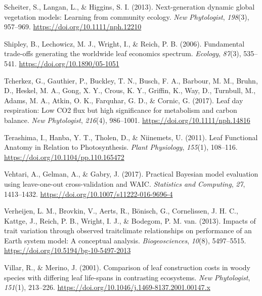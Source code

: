 \documentclass[
  12pt,
  a4paper,
,tablecaptionabove
]{scrartcl}
\newlength{\cslhangindent}
\newenvironment{CSLReferences}[2] %
 {%
  \setlength{\parindent}{0pt}
  \ifodd #1 \everypar{\setlength{\hangindent}{\cslhangindent}}\ignorespaces\fi
  \ifnum #2 > 0
  \setlength{\parskip}{#2\baselineskip}
  \fi
 }%
 {}
\begin{document}
\begin{CSLReferences}{1}{0}
\leavevmode{}%
Scheiter, S., Langan, L., \& Higgins, S. I. (2013). Next-generation
dynamic global vegetation models: {Learning} from community ecology.
\emph{New Phytologist}, \emph{198}(3), 957--969.
\url{https://doi.org/10.1111/nph.12210}

\leavevmode{}%
Shipley, B., Lechowicz, M. J., Wright, I., \& Reich, P. B. (2006).
Fundamental trade-offs generating the worldwide leaf economics spectrum.
\emph{Ecology}, \emph{87}(3), 535--541.
\url{https://doi.org/10.1890/05-1051}

\leavevmode{}%
Tcherkez, G., Gauthier, P., Buckley, T. N., Busch, F. A., Barbour, M.
M., Bruhn, D., Heskel, M. A., Gong, X. Y., Crous, K. Y., Griffin, K.,
Way, D., Turnbull, M., Adams, M. A., Atkin, O. K., Farquhar, G. D., \&
Cornic, G. (2017). Leaf day respiration: Low {CO2} flux but high
significance for metabolism and carbon balance. \emph{New Phytologist},
\emph{216}(4), 986--1001. \url{https://doi.org/10.1111/nph.14816}

\leavevmode{}%
Terashima, I., Hanba, Y. T., Tholen, D., \& Niinemets, U. (2011). Leaf
{Functional Anatomy} in {Relation} to {Photosynthesis}. \emph{Plant
Physiology}, \emph{155}(1), 108--116.
\url{https://doi.org/10.1104/pp.110.165472}

\leavevmode{}%
Vehtari, A., Gelman, A., \& Gabry, J. (2017). Practical {Bayesian} model
evaluation using leave-one-out cross-validation and {WAIC}.
\emph{Statistics and Computing}, \emph{27}, 1413--1432.
\url{https://doi.org/10.1007/s11222-016-9696-4}

\leavevmode{}%
Verheijen, L. M., Brovkin, V., Aerts, R., Bönisch, G., Cornelissen, J.
H. C., Kattge, J., Reich, P. B., Wright, I. J., \& Bodegom, P. M. van.
(2013). Impacts of trait variation through observed
trait\textendash climate relationships on performance of an {Earth}
system model: A conceptual analysis. \emph{Biogeosciences},
\emph{10}(8), 5497--5515. \url{https://doi.org/10.5194/bg-10-5497-2013}

\leavevmode{}%
Villar, R., \& Merino, J. (2001). Comparison of leaf construction costs
in woody species with differing leaf life-spans in contrasting
ecosystems. \emph{New Phytologist}, \emph{151}(1), 213--226.
\url{https://doi.org/10.1046/j.1469-8137.2001.00147.x}


\end{CSLReferences}
\end{document}
